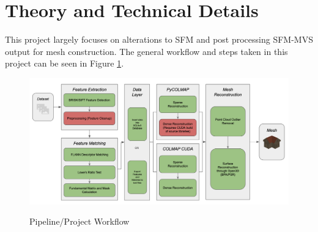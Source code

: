 \documentclass[conference,compsoc]{IEEEtran}
\begin{document}
%




\section{Theory and Technical Details}
This project largely focuses on alterations to SFM and post processing SFM-MVS 
output for mesh construction. The general workflow and steps taken in this project
can be seen in Figure \ref{fig:pipeline}.
\begin{figure}[ht!]
    \centering
    {{\includegraphics[width=.4\textwidth]{figures/pipeline.png} }}
    \caption{Pipeline/Project Workflow}
    \label{fig:pipeline}
  \end{figure}
\end{document}
